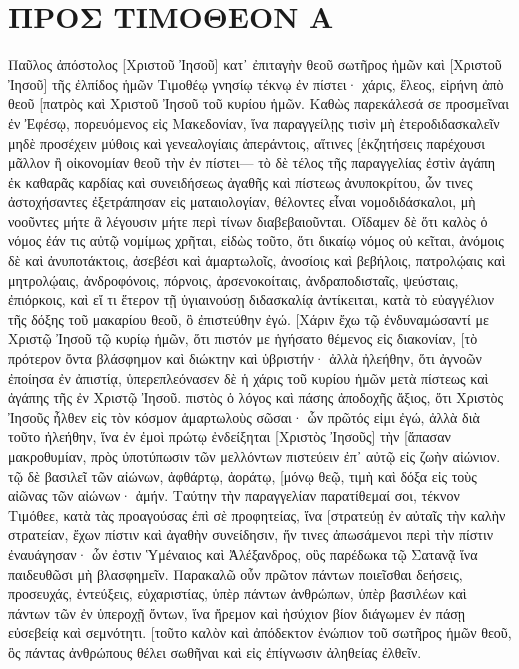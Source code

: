 \section{ΠΡΟΣ ΤΙΜΟΘΕΟΝ Α}
Παῦλος ἀπόστολος [Χριστοῦ Ἰησοῦ] κατ᾽ ἐπιταγὴν θεοῦ σωτῆρος ἡμῶν καὶ [Χριστοῦ Ἰησοῦ] τῆς ἐλπίδος ἡμῶν 
Τιμοθέῳ γνησίῳ τέκνῳ ἐν πίστει· χάρις, ἔλεος, εἰρήνη ἀπὸ θεοῦ [πατρὸς καὶ Χριστοῦ Ἰησοῦ τοῦ κυρίου ἡμῶν. 
Καθὼς παρεκάλεσά σε προσμεῖναι ἐν Ἐφέσῳ, πορευόμενος εἰς Μακεδονίαν, ἵνα παραγγείλῃς τισὶν μὴ ἑτεροδιδασκαλεῖν 
μηδὲ προσέχειν μύθοις καὶ γενεαλογίαις ἀπεράντοις, αἵτινες [ἐκζητήσεις παρέχουσι μᾶλλον ἢ οἰκονομίαν θεοῦ τὴν ἐν πίστει— 
τὸ δὲ τέλος τῆς παραγγελίας ἐστὶν ἀγάπη ἐκ καθαρᾶς καρδίας καὶ συνειδήσεως ἀγαθῆς καὶ πίστεως ἀνυποκρίτου, 
ὧν τινες ἀστοχήσαντες ἐξετράπησαν εἰς ματαιολογίαν, 
θέλοντες εἶναι νομοδιδάσκαλοι, μὴ νοοῦντες μήτε ἃ λέγουσιν μήτε περὶ τίνων διαβεβαιοῦνται. 
Οἴδαμεν δὲ ὅτι καλὸς ὁ νόμος ἐάν τις αὐτῷ νομίμως χρῆται, 
εἰδὼς τοῦτο, ὅτι δικαίῳ νόμος οὐ κεῖται, ἀνόμοις δὲ καὶ ἀνυποτάκτοις, ἀσεβέσι καὶ ἁμαρτωλοῖς, ἀνοσίοις καὶ βεβήλοις, πατρολῴαις καὶ μητρολῴαις, ἀνδροφόνοις, 
πόρνοις, ἀρσενοκοίταις, ἀνδραποδισταῖς, ψεύσταις, ἐπιόρκοις, καὶ εἴ τι ἕτερον τῇ ὑγιαινούσῃ διδασκαλίᾳ ἀντίκειται, 
κατὰ τὸ εὐαγγέλιον τῆς δόξης τοῦ μακαρίου θεοῦ, ὃ ἐπιστεύθην ἐγώ. 
[Χάριν ἔχω τῷ ἐνδυναμώσαντί με Χριστῷ Ἰησοῦ τῷ κυρίῳ ἡμῶν, ὅτι πιστόν με ἡγήσατο θέμενος εἰς διακονίαν, 
[τὸ πρότερον ὄντα βλάσφημον καὶ διώκτην καὶ ὑβριστήν· ἀλλὰ ἠλεήθην, ὅτι ἀγνοῶν ἐποίησα ἐν ἀπιστίᾳ, 
ὑπερεπλεόνασεν δὲ ἡ χάρις τοῦ κυρίου ἡμῶν μετὰ πίστεως καὶ ἀγάπης τῆς ἐν Χριστῷ Ἰησοῦ. 
πιστὸς ὁ λόγος καὶ πάσης ἀποδοχῆς ἄξιος, ὅτι Χριστὸς Ἰησοῦς ἦλθεν εἰς τὸν κόσμον ἁμαρτωλοὺς σῶσαι· ὧν πρῶτός εἰμι ἐγώ, 
ἀλλὰ διὰ τοῦτο ἠλεήθην, ἵνα ἐν ἐμοὶ πρώτῳ ἐνδείξηται [Χριστὸς Ἰησοῦς] τὴν [ἅπασαν μακροθυμίαν, πρὸς ὑποτύπωσιν τῶν μελλόντων πιστεύειν ἐπ᾽ αὐτῷ εἰς ζωὴν αἰώνιον. 
τῷ δὲ βασιλεῖ τῶν αἰώνων, ἀφθάρτῳ, ἀοράτῳ, [μόνῳ θεῷ, τιμὴ καὶ δόξα εἰς τοὺς αἰῶνας τῶν αἰώνων· ἀμήν. 
Ταύτην τὴν παραγγελίαν παρατίθεμαί σοι, τέκνον Τιμόθεε, κατὰ τὰς προαγούσας ἐπὶ σὲ προφητείας, ἵνα [στρατεύῃ ἐν αὐταῖς τὴν καλὴν στρατείαν, 
ἔχων πίστιν καὶ ἀγαθὴν συνείδησιν, ἥν τινες ἀπωσάμενοι περὶ τὴν πίστιν ἐναυάγησαν· 
ὧν ἐστιν Ὑμέναιος καὶ Ἀλέξανδρος, οὓς παρέδωκα τῷ Σατανᾷ ἵνα παιδευθῶσι μὴ βλασφημεῖν. 
Παρακαλῶ οὖν πρῶτον πάντων ποιεῖσθαι δεήσεις, προσευχάς, ἐντεύξεις, εὐχαριστίας, ὑπὲρ πάντων ἀνθρώπων, 
ὑπὲρ βασιλέων καὶ πάντων τῶν ἐν ὑπεροχῇ ὄντων, ἵνα ἤρεμον καὶ ἡσύχιον βίον διάγωμεν ἐν πάσῃ εὐσεβείᾳ καὶ σεμνότητι. 
[τοῦτο καλὸν καὶ ἀπόδεκτον ἐνώπιον τοῦ σωτῆρος ἡμῶν θεοῦ, 
ὃς πάντας ἀνθρώπους θέλει σωθῆναι καὶ εἰς ἐπίγνωσιν ἀληθείας ἐλθεῖν. 
